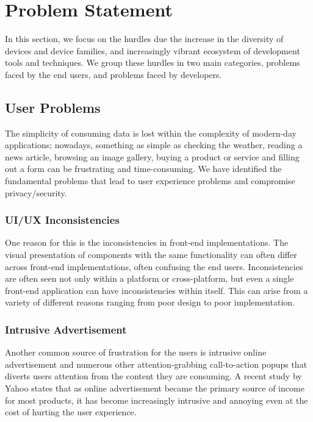 \section{Problem Statement} \label{problemStatement}

In this section, we focus on the hurdles due the increase in the diversity of devices and device families, and increasingly vibrant ecosystem of development tools and techniques. We group these hurdles in two main categories, problems faced by the end users, and problems faced by developers.

\subsection{User Problems}

The simplicity of consuming data is lost within the complexity of modern-day applications; nowadays, something as simple as checking the weather, reading a news article, browsing an image gallery, buying a product or service and filling out a form can be frustrating and time-consuming. We have identified the fundamental problems that lead to user experience problems and compromise privacy/security.

\subsubsection{UI/UX Inconsistencies}
One reason for this is the inconsistencies in front-end implementations. The visual presentation of components with the same functionality can often differ across front-end implementations, often confusing the end users. Inconsistencies are often seen not only within a platform or cross-platform, but even a single front-end application can have inconsistencies within itself. This can arise from a variety of different reasons ranging from poor design to poor implementation.

\subsubsection{Intrusive Advertisement}
Another common source of frustration for the users is intrusive online advertisement and numerous other attention-grabbing call-to-action popups that diverts users attention from the content they are consuming. A recent study by Yahoo \cite{IntrusiveAds} states that as online advertisement became the primary source of income for most products, it has become increasingly intrusive and annoying even at the cost of hurting the user experience.


